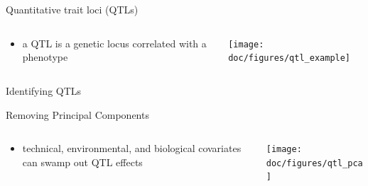 \documentclass{beamer}
\begin{document}
\begin{frame}{Quantitative trait loci (QTLs)}
    \begin{columns}
        \begin{column}{0.4\textwidth}
            \begin{itemize}
                \item a QTL is a genetic locus correlated with a phenotype
            \end{itemize}
        \end{column}
        \begin{column}{0.65\textwidth}
            \texttt{[image: doc/figures/qtl\_example]}
        \end{column}
    \end{columns}
\end{frame}

\begin{frame}{Identifying QTLs}
    \begin{center}
        \tikzexternaldisable
        
        \tikzexternalenable
    \end{center}
\end{frame}

\begin{frame}{Removing Principal Components}
    \begin{columns}
    \begin{column}{0.4\textwidth}
        \begin{itemize}
            \item technical, environmental, and biological covariates can swamp
                out QTL effects
        \end{itemize}
    \end{column}
    \begin{column}{0.6\textwidth}
        \texttt{[image: doc/figures/qtl\_pca]}
    \end{column}
    \end{columns}
\end{frame}
\end{document}
